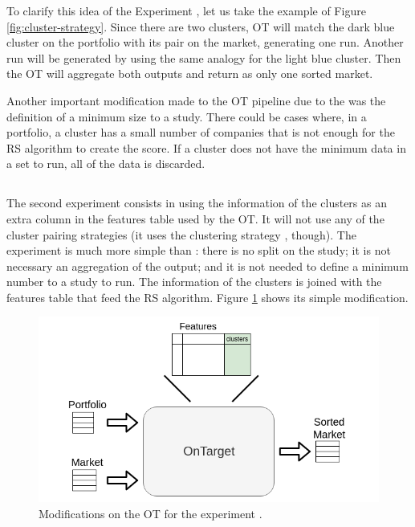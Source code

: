 To clarify this idea of the Experiment \nameExperimentI{}, let us take the example of Figure \ref{fig:cluster-strategy}. Since there are two clusters, OT will match the dark blue cluster on the portfolio with its pair on the market, generating one run. Another run will be generated by using the same analogy for the light blue cluster. Then the OT will aggregate both outputs and return as only one sorted market.

Another important modification made to the OT pipeline due to the \nameExperimentI{} was the definition of a minimum size to a study. There could be cases where, in a portfolio, a cluster has a small number of companies that is not enough for the RS algorithm to create the score. If a cluster does not have the minimum data in a set to run, all of the data is discarded.

\subsection{\fullNameExperimentII{}}

The second experiment consists in using the information of the clusters as an extra column in the features table used by the OT. It will not use any of the cluster pairing strategies (it uses the clustering strategy \nameClusterStrategyA{}, though). The experiment \nameExperimentII{} is much more simple than \nameExperimentI{}: there is no split on the study; it is not necessary an aggregation of the output; and it is not needed to define a minimum number to a study to run. The information of the clusters is joined with the features table that feed the RS algorithm. Figure \ref{fig:clusters-as-features} shows its simple modification.

\begin{figure}[H]
   \centering
   \includegraphics[width=\linewidth]{fig/ch3-clusters-as-features.png}
   \caption{Modifications on the OT for the experiment \nameExperimentII{}.}
   \label{fig:clusters-as-features}
\end{figure}